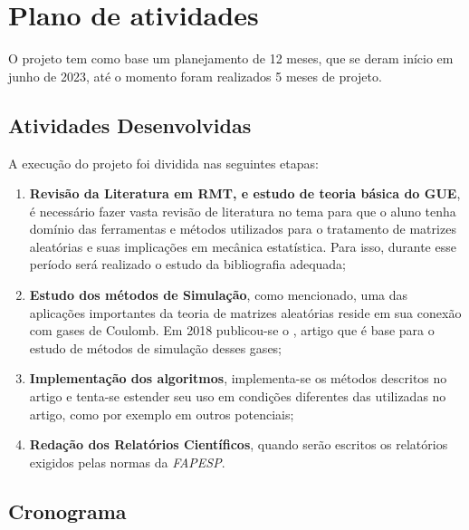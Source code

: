 \documentclass[12pt]{report}
\begin{document}
	{\let\clearpage\relax \chapter{Plano de atividades}}\label{chp:plano}
	
	O projeto tem como base um planejamento de 12 meses, que se deram início em junho de 2023, até o momento foram realizados 5 meses de projeto.
	
	\section{Atividades Desenvolvidas}
	\label{section:atividadesdesenvolvidas}
	
	A execução do projeto foi dividida nas seguintes etapas:
	
	\begin{enumerate}
		\item \textbf{Revisão da Literatura em RMT, e estudo de teoria básica do GUE}, é necessário fazer vasta revisão de literatura no tema para que o aluno tenha domínio das ferramentas e métodos utilizados para o tratamento de matrizes aleatórias e suas implicações em mecânica estatística. Para isso, durante esse período será realizado o estudo da bibliografia adequada;
		
		\item \textbf{Estudo dos métodos de Simulação}, como mencionado, uma das aplicações importantes da teoria de matrizes aleatórias reside em sua conexão com gases de Coulomb. Em 2018 publicou-se o \cite{Chafa__2018}, artigo que é base para o estudo de métodos de simulação desses gases;
		
		\item \textbf{Implementação dos algoritmos}, implementa-se os métodos descritos no artigo e tenta-se estender seu uso em condições diferentes das utilizadas no artigo, como por exemplo em outros potenciais;
		
		\item \textbf{Redação dos Relatórios Científicos}, quando serão escritos os relatórios exigidos pelas normas da \textit{FAPESP}.
		
	\end{enumerate}
	
	\section{Cronograma}
	
	
	
\end{document}
